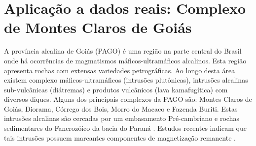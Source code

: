 \chapter{Aplicação a dados reais: Complexo de Montes Claros de Goiás}
\label{sec:real_application}

A província alcalina de Goiás (PAGO) é uma região na parte central do Brasil onde há ocorrências de magmatismos máficos-ultramáficos alcalinos. Esta região apresenta rochas com extensas variedades petrográficas. Ao longo desta área existem complexo máficos-ultramáficos (intrusões plutônicas), intrusões alcalinas sub-vulcânicas (diátremas) e produtos vulcânicos (lava kamafugítica) com diversos diques. Alguns dos principais complexos da PAGO são: Montes Claros de Goiás, Diorama, Córrego dos Bois, Morro do Macaco e Fazenda Buriti. Estas intrusões alcalinas são cercadas por um embasamento Pré-cambriano e rochas sedimentares do Fanerozóico da bacia do Paraná \citep{junqueira_brod_2005,carlson_etal_2007,marangoni_mantovani_2013,dutra_etal_2014}. Estudos recentes indicam que tais intrusões possuem marcantes componentes de magnetização remanente \citep{marangoni_mantovani_2013,oliveirajr_etal_2015,marangoni_etal_2016,zhang_etal_2018}.

